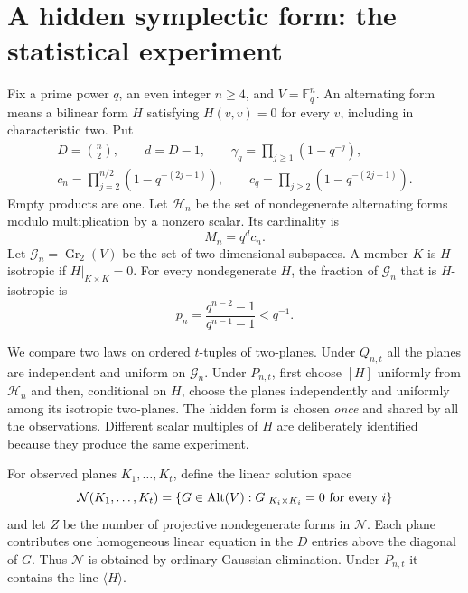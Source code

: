 
\section{A hidden symplectic form: the statistical experiment}

Fix a prime power $q$, an even integer $n\ge4$, and $V=\mathbb F_q^n$.
An alternating form means a bilinear form $H$ satisfying $H(v,v)=0$ for
every $v$, including in characteristic two. Put
\begin{gather*}
 D=\binom n2,\qquad d=D-1,\qquad
 \gamma_q=\prod_{j\ge1}(1-q^{-j}),\\
 c_n=\prod_{j=2}^{n/2}(1-q^{-(2j-1)}),\qquad
 c_q=\prod_{j\ge2}(1-q^{-(2j-1)}).
\end{gather*}
Empty products are one. Let $\mathcal H_n$ be the set of nondegenerate
alternating forms modulo multiplication by a nonzero scalar. Its cardinality is
\begin{equation}\label{hidden:eq:M}
 M_n=q^d c_n.
\end{equation}
Let $\mathcal G_n=\operatorname{Gr}_2(V)$ be the set of two-dimensional
subspaces. A member $K$ is $H$-isotropic if $H|_{K\times K}=0$.
For every nondegenerate $H$, the fraction of $\mathcal G_n$ that is
$H$-isotropic is
\begin{equation}\label{hidden:eq:p}
 p_n=\frac{q^{n-2}-1}{q^{n-1}-1}<q^{-1}.
\end{equation}

We compare two laws on ordered $t$-tuples of two-planes.
Under $Q_{n,t}$ all the planes are independent and uniform on
$\mathcal G_n$. Under $P_{n,t}$, first choose $[H]$ uniformly from
$\mathcal H_n$ and then, conditional on $H$, choose the planes independently
and uniformly among its isotropic two-planes. The hidden form is chosen
\emph{once} and shared by all the observations. Different scalar multiples
of $H$ are deliberately identified because they produce the same experiment.

For observed planes $K_1,\ldots,K_t$, define the linear solution space
\begin{equation}\label{hidden:eq:solution}
 \mathcal N(K_1,\ldots,K_t)
 =\{G\in\operatorname{Alt}(V):G|_{K_i\times K_i}=0\text{ for every }i\}
\end{equation}
and let $Z$ be the number of projective nondegenerate forms in
$\mathcal N$. Each plane contributes one homogeneous linear equation in the
$D$ entries above the diagonal of $G$. Thus $\mathcal N$ is obtained by
ordinary Gaussian elimination. Under $P_{n,t}$ it contains the line
$\langle H\rangle$.

